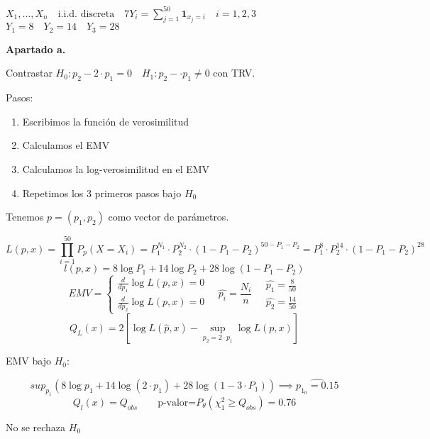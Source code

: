 \(
X_1,\dots,X_n \quad \text{i.i.d. discreta} \quad 7
Y_i=\sum_{j=1}^{50} \mathbf{1}_{x_j=i} \quad i=1,2,3
\)
\(
Y_1=8 \quad Y_2=14 \quad Y_3=28
\)

\textbf{Apartado a.}

Contrastar $H_0: p_2-2\cdot p_1=0 \quad H_1: p_2-\cdot p_1 \neq 0$
con TRV.

Pasos:
\begin{enumerate}
    \item Escribimos la función de verosimilitud
    \item Calculamos el EMV
    \item Calculamos la log-verosimilitud en el EMV
    \item Repetimos los 3 primeros pasos bajo $H_0$
\end{enumerate}

Tenemos $p=(p_1,p_2)$ como vector de parámetros.

\[
L(p,x)=\prod_{i=1}^{50} P_p(X=X_i)=P_1^{N_1}\cdot P_2^{N_2}\cdot (1-P_1-P_2)^{50-P_1-P_2}=P_1^8\cdot P_2^{14} \cdot (1-P_1-P_2)^{28}
\]
\[
l(p,x)=8 \log P_1 +14 \log P_2 +28 \log (1-P_1-P_2)
\]
\[
EMV=\left\{
\begin{array}{l}
    \frac{d}{d p_1} \log L(p,x)=0\\
    \frac{d}{d p_2} \log L(p,x)=0
\end{array}
\right.
\quad \hat{p_i}=\frac{N_i}{n}
\quad
\begin{matrix}
    \hat{p_1}=\frac{8}{50}\\
    \hat{p_2}=\frac{14}{50}
\end{matrix}
\]
\[
Q_L(x)=2[\log L(\hat{p},x)-\sup_{p_2=2\cdot p_1}\log L(p,x)]
\]

EMV bajo $H_0$:

\[
sup_{p_1}(8 \log p_1 +14 \log(2\cdot p_1)+28 \log(1-3\cdot P_1))\implies \hat{p_{1_0}=0.15}
\]
\[
Q_l(x)=Q_{obs} \qquad \text{p-valor=}P_\theta(\chi^2_1 \geq Q_{obs})=0.76
\]

No se rechaza $H_0$



